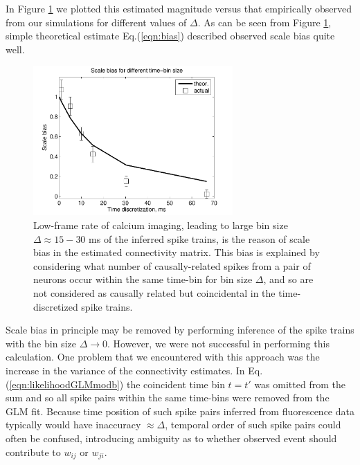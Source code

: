 In Figure \ref{fig:bias} we plotted this estimated magnitude versus that empirically observed from our simulations for different values of $\Delta$. As can be seen from Figure \ref{fig:bias}, simple theoretical estimate Eq.(\ref{eqn:bias}) described observed scale bias quite well.

\begin{figure}[h]
\centering
\includegraphics[width=3in]{../figs/FigureA4_scale_bias}
\caption{Low-frame rate of calcium imaging, leading to large bin size $\Delta\approx 15-30$ ms of the inferred spike trains, is the reason of scale bias in the estimated connectivity matrix.
This bias is explained by considering what number of causally-related spikes from
a pair of neurons occur within the same time-bin for bin size $\Delta$, and so are not considered as causally related but coincidental in the time-discretized spike trains.}
\label{fig:bias}
\end{figure}

Scale bias in principle may be removed by performing inference of the spike trains with the bin size $\Delta \rightarrow 0$.
However, we were not successful in performing this calculation.
One problem that we encountered with this approach was the increase in the variance of the connectivity estimates.
In Eq.(\ref{eqn:likelihoodGLMmodb}) the coincident time bin $t=t'$ was omitted from the sum and so all spike pairs within the same time-bins were removed from the GLM fit.  Because time position of such spike pairs inferred from fluorescence data typically would have inaccuracy $\approx \Delta$, temporal order of such spike pairs could often be confused, introducing ambiguity as to whether observed event should contribute to $w_{ij}$ or $w_{ji}$. 


